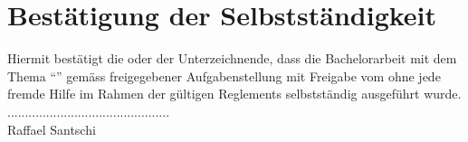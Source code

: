 %
%

\thispagestyle{empty}


\newpage
\thispagestyle{empty}

\chapter*{Bestätigung der Selbstständigkeit} 

Hiermit bestätigt die oder der Unterzeichnende, dass die Bachelorarbeit mit dem Thema "`\textbf{\myTitle}"' gemäss freigegebener Aufgabenstellung mit Freigabe vom \releaseDate ohne jede 
fremde Hilfe im Rahmen der gültigen Reglements selbstständig ausgeführt wurde.\\ [2cm]
..............................................\\ 
Raffael Santschi

\newpage{}